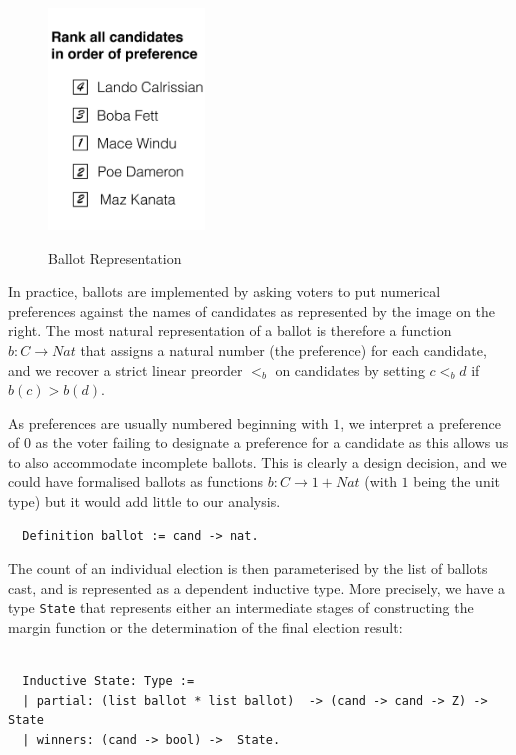 \begin{figure}
   \begin{center}
    {\includegraphics[width=0.37\textwidth]{bal-cropped.pdf}}
    \caption{Ballot Representation}
    \end{center}
\end{figure}
In practice, ballots are
implemented by asking voters to put numerical preferences against
the names of candidates as represented by the image on the right.
The most natural representation of a ballot is therefore a function
$b: C \to Nat$ that assigns a natural number (the preference) for
each candidate, and we recover a strict linear preorder $<_b$ on candidates
by setting $c <_b d$ if $b(c) > b(d)$. 

As preferences are usually
numbered beginning with $1$, we interpret a preference of $0$ as the
voter failing to designate a preference for a candidate
as this allows us to also accommodate incomplete ballots.
This is clearly a design decision, and we could have formalised
ballots as functions $b: C \to 1 + Nat$ (with $1$ being the unit
type) but it would add little to our analysis.
%
%
\begin{verbatim}
  Definition ballot := cand -> nat.
\end{verbatim}

\noindent
The count of an individual election is then parameterised by the list
of ballots cast, and is represented as a dependent inductive type.
More precisely, we have a type \texttt{State} that represents either
an
intermediate stages of constructing the margin function or the
determination of the final election result:
\begin{verbatim}

  Inductive State: Type :=
  | partial: (list ballot * list ballot)  -> (cand -> cand -> Z) -> State
  | winners: (cand -> bool) ->  State.

\end{verbatim}

